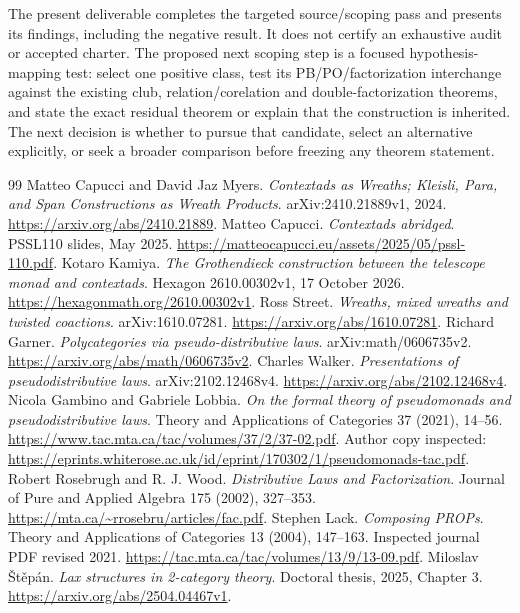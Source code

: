 \documentclass[11pt,a4paper]{article}
\begin{document}
The present deliverable completes the targeted source/scoping pass and presents
its findings, including the negative result. It does not certify an exhaustive
audit or accepted charter. The proposed next scoping step is a focused hypothesis-mapping test: select one
positive class, test its PB/PO/factorization interchange against the existing
club, relation/corelation and double-factorization theorems, and state the exact
residual theorem or explain that the construction is inherited. The next decision
is whether to pursue that candidate, select an alternative explicitly, or seek a
broader comparison before freezing any theorem statement.

\begin{thebibliography}{99}
 Matteo Capucci and David Jaz Myers.
\emph{Contextads as Wreaths; Kleisli, Para, and Span Constructions as Wreath Products}.
arXiv:2410.21889v1, 2024. \url{https://arxiv.org/abs/2410.21889}.
 Matteo Capucci. \emph{Contextads abridged}.
PSSL110 slides, May 2025. \url{https://matteocapucci.eu/assets/2025/05/pssl-110.pdf}.
 Kotaro Kamiya.
\emph{The Grothendieck construction between the telescope monad and contextads}.
Hexagon 2610.00302v1, 17 October 2026.
\url{https://hexagonmath.org/2610.00302v1}.
 Ross Street. \emph{Wreaths, mixed wreaths and twisted coactions}.
arXiv:1610.07281. \url{https://arxiv.org/abs/1610.07281}.
 Richard Garner. \emph{Polycategories via pseudo-distributive laws}.
arXiv:math/0606735v2. \url{https://arxiv.org/abs/math/0606735v2}.
 Charles Walker. \emph{Presentations of pseudodistributive laws}.
arXiv:2102.12468v4. \url{https://arxiv.org/abs/2102.12468v4}.
 Nicola Gambino and Gabriele Lobbia.
\emph{On the formal theory of pseudomonads and pseudodistributive laws}.
Theory and Applications of Categories 37 (2021), 14--56.
\url{https://www.tac.mta.ca/tac/volumes/37/2/37-02.pdf}.
Author copy inspected:
\url{https://eprints.whiterose.ac.uk/id/eprint/170302/1/pseudomonads-tac.pdf}.
 Robert Rosebrugh and R. J. Wood.
\emph{Distributive Laws and Factorization}.
Journal of Pure and Applied Algebra 175 (2002), 327--353.
\url{https://mta.ca/~rrosebru/articles/fac.pdf}.
 Stephen Lack. \emph{Composing PROPs}.
Theory and Applications of Categories 13 (2004), 147--163.
Inspected journal PDF revised 2021.
\url{https://tac.mta.ca/tac/volumes/13/9/13-09.pdf}.
 Miloslav \v{S}t\v{e}p\'an.
\emph{Lax structures in 2-category theory}. Doctoral thesis, 2025, Chapter 3.
\url{https://arxiv.org/abs/2504.04467v1}.

\end{thebibliography}
\end{document}

